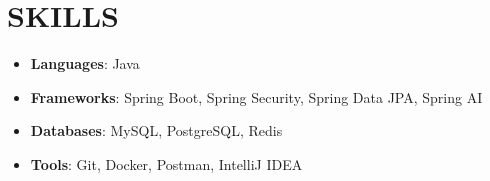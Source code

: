 \section{SKILLS}
\begin{itemize}[leftmargin=0in, label={}, itemsep=4pt, topsep=4pt, parsep=0pt, partopsep=0pt]
  \item \small\textbf{Languages}: Java
  \item \small\textbf{Frameworks}: Spring Boot, Spring Security, Spring Data JPA, Spring AI
  \item \small\textbf{Databases}: MySQL, PostgreSQL, Redis
  \item \small\textbf{Tools}: Git, Docker, Postman, IntelliJ IDEA
\end{itemize}
